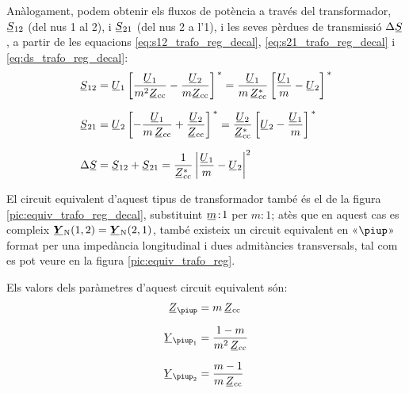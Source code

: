 Anàlogament, podem obtenir els fluxos de potència a través del
transformador, $\cmplx{S}_{12}$ (del nus 1 al 2), i $\cmplx{S}_{21}$
(del nus 2 a l'1), i les seves pèrdues de transmissió
$\Delta\cmplx{S}$, a partir de les equacions
\eqref{eq:s12_trafo_reg_decal},  \eqref{eq:s21_trafo_reg_decal} i
\eqref{eq:ds_trafo_reg_decal}:  
\begin{align}
   \cmplx{S}_{12} &= \cmplx{U}_1 \left[ \frac{\cmplx{U}_1}{m^2 \cmplx{Z}\ped{cc}} - \frac{\cmplx{U}_2}{m \cmplx{Z}\ped{cc}} \right]^{\,*} = \frac{\cmplx{U}_1}{m \,\cmplx{Z}\ped{cc}^*} \left[ \frac{\cmplx{U}_1}{m} - \cmplx{U}_2 \right]^{\,*}  \\[1.5ex]
   \cmplx{S}_{21} &= \cmplx{U}_2 \left[ - \frac{\cmplx{U}_1}{m \,\cmplx{Z}\ped{cc}} + \frac{\cmplx{U}_2} {\cmplx{Z}\ped{cc}} \right]^{\,*} = \frac{\cmplx{U}_2}{\cmplx{Z}\ped{cc}^*} \left[  \cmplx{U}_2 - \frac{\cmplx{U}_1}{m}  \right]^{\,*} \\[1.5ex]
 \Delta\cmplx{S} &= \cmplx{S}_{12} + \cmplx{S}_{21} = \frac{1}{\cmplx{Z}\ped{cc}^*}  \left|
    \frac{\cmplx{U}_1}{m} - \cmplx{U}_2 \right|^2
\end{align}


El circuit equivalent d'aquest tipus de transformador també és el de la
 figura \vref{pic:equiv_trafo_reg_decal}, substituint $\cmplx{m}\!:\!1$ per $m\!:\!1$;  atès que en aquest cas es compleix $\mcmplx{Y}\ped{N}(1,2) = \mcmplx{Y}\ped{N}(2,1)$, també
 existeix un circuit equivalent en «$\piup$» format per una impedància longitudinal i dues admitàncies transversals, tal com es pot veure en la figura  \vref{pic:equiv_trafo_reg}.

\begin{center}
    
    \label{pic:equiv_trafo_reg}
\end{center}

Els valors dels paràmetres d'aquest circuit equivalent són:
\begin{align}
   \cmplx{Z}_\piup &= m \, \cmplx{Z}\ped{cc} \\[1.5ex]
   \cmplx{Y}_{\piup_1} &= \frac{1-m}{m^2 \,\cmplx{Z}\ped{cc}} \\[1.5ex]
   \cmplx{Y}_{\piup_2} &= \frac{m-1}{m\, \cmplx{Z}\ped{cc}}
\end{align}

